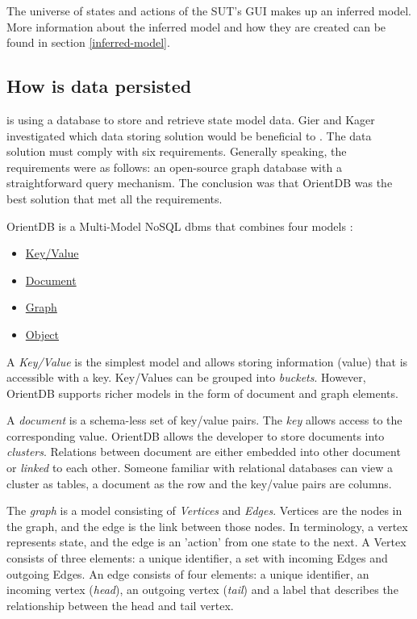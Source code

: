 The universe of states and actions of the SUT's GUI makes up an inferred model. More information about the inferred model and how they are created can be found in section \ref{inferred-model}.

\subsection{How is data persisted}

\testar is using a database to store and retrieve state model data. Gier and Kager investigated which data storing solution would be beneficial to \testar \cite{GierKager}. The data solution must comply with six requirements. Generally speaking, the requirements were as follows: an open-source graph database with a straightforward query mechanism. The conclusion was that OrientDB was the best solution that met all the requirements.

\begin{samepage}
OrientDB is a Multi-Model NoSQL \acrfull{dbms} that combines four models \cite{orientDbModeling}:

\begin{itemize}
    \item \hyperlink{db:key-value}{Key/Value}
    \item \hyperlink{db:document}{Document}
    \item \hyperlink{db:graph}{Graph}
    \item \hyperlink{db:object}{Object}
\end{itemize}
\end{samepage}

A \hypertarget{db:key-value}{\emph{Key/Value}} is the simplest model and allows storing information (value) that is accessible with a key. Key/Values can be grouped into \textit{buckets}. However, OrientDB supports richer models in the form of document and graph elements.

A \hypertarget{db:document}{\emph{document}} is a schema-less set of key/value pairs. The \emph{key} allows access to the corresponding value. OrientDB allows the developer to store documents into \emph{clusters}. Relations between document are either embedded into other document or \emph{linked} to each other. Someone familiar with relational databases can view a cluster as tables, a document as the row and the key/value pairs are columns.

The \hypertarget{db:graph}{\emph{graph}} is a model consisting of \emph{Vertices} and \emph{Edges}. Vertices are the nodes in the graph, and the edge is the link between those nodes. In \testar terminology, a vertex represents state, and the edge is an 'action' from one state to the next. A Vertex consists of three elements: a unique identifier, a set with incoming Edges and outgoing Edges. An edge consists of four elements: a unique identifier, an incoming vertex (\emph{head}), an outgoing vertex (\emph{tail}) and a label that describes the relationship between the head and tail vertex.\par

